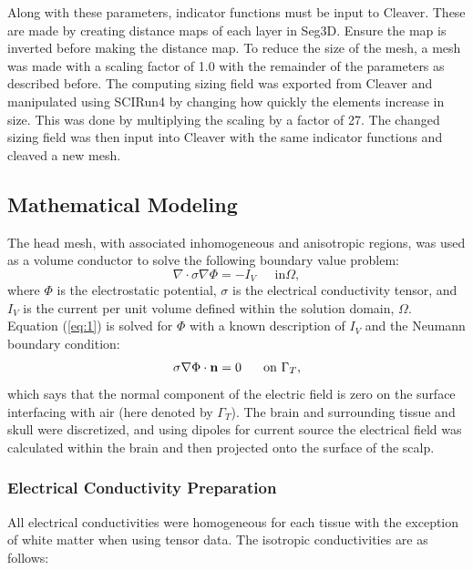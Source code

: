  Along with these parameters, indicator functions must be input to Cleaver. These are made by creating distance maps of each layer in Seg3D. Ensure the map is inverted before making the distance map. To reduce the size of the mesh, a mesh was made with a scaling factor of 1.0 with the remainder of the parameters as described before. The computing sizing field was exported from Cleaver and manipulated using SCIRun4 by changing how quickly the elements increase in size. This was done by multiplying the scaling by a factor of 27. The changed sizing field was then input into Cleaver with the same indicator functions and cleaved a new mesh.

\subsection{Mathematical Modeling}
\label{sec:math}


The head mesh, with associated inhomogeneous and anisotropic regions, was used as a volume conductor to solve the following boundary value problem:
%
\begin{equation}
\label{eq:1} \nabla\cdot\sigma\nabla\Phi = -I_{V} \;\;\;\;\mbox{ in
}\Omega,
\end{equation} 
%
where $\Phi$ is the electrostatic potential, $\sigma$ is the electrical conductivity tensor, and $I_{V}$ is the current per unit volume defined within the solution domain, $\Omega$. Equation (\ref{eq:1}) is solved for $\Phi$ with a known description of $I_{V}$ and the Neumann boundary condition:
%
\begin{equation} \sigma\nabla\Phi\cdot{\bf
n} = 0\;\;\;\;\;\mbox{ on }\Gamma_{T}, 
\end{equation} 
%
which says that the normal component of the electric field is zero on the surface interfacing with air (here denoted by $\Gamma_{T}$). The brain and surrounding tissue and skull were discretized, and using dipoles for current source the electrical field was calculated within the brain and then projected onto the surface of the scalp. \cite{ref:math}

\subsubsection{Electrical Conductivity Preparation}
\label{sec:cond}

All electrical conductivities were homogeneous for each tissue with the exception of white matter when using tensor data. The isotropic conductivities \cite{ref:cond} are as follows: 


